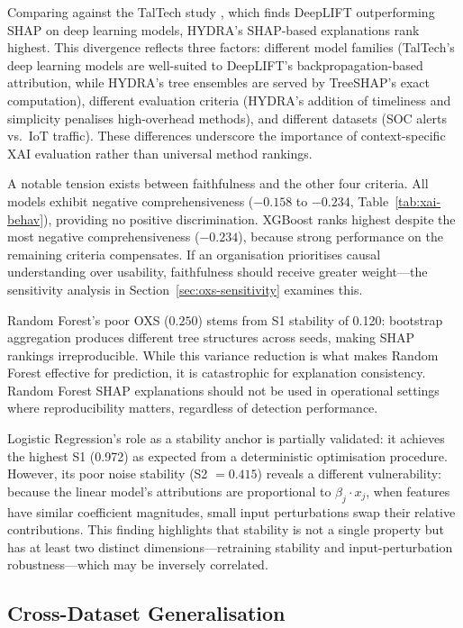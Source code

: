 \documentclass[12pt,a4paper]{report}
\begin{document}
Comparing against the TalTech study \cite{kalakoti2025}, which finds DeepLIFT outperforming SHAP on deep learning models, HYDRA's SHAP-based explanations rank highest. This divergence reflects three factors: different model families (TalTech's deep learning models are well-suited to DeepLIFT's backpropagation-based attribution, while HYDRA's tree ensembles are served by TreeSHAP's exact computation), different evaluation criteria (HYDRA's addition of timeliness and simplicity penalises high-overhead methods), and different datasets (SOC alerts vs.\ IoT traffic). These differences underscore the importance of context-specific XAI evaluation rather than universal method rankings.

A notable tension exists between faithfulness and the other four criteria. All models exhibit negative comprehensiveness ($-0.158$ to $-0.234$, Table~\ref{tab:xai-behav}), providing no positive discrimination. XGBoost ranks highest despite the most negative comprehensiveness ($-0.234$), because strong performance on the remaining criteria compensates. If an organisation prioritises causal understanding over usability, faithfulness should receive greater weight---the sensitivity analysis in Section~\ref{sec:oxs-sensitivity} examines this.

Random Forest's poor OXS ($0.250$) stems from S1 stability of 0.120: bootstrap aggregation \cite{breiman2001} produces different tree structures across seeds, making SHAP rankings irreproducible. While this variance reduction is what makes Random Forest effective for prediction, it is catastrophic for explanation consistency. Random Forest SHAP explanations should not be used in operational settings where reproducibility matters, regardless of detection performance.

Logistic Regression's role as a stability anchor is partially validated: it achieves the highest S1 (0.972) as expected from a deterministic optimisation procedure. However, its poor noise stability (S2 $= 0.415$) reveals a different vulnerability: because the linear model's attributions are proportional to $\beta_j \cdot x_j$, when features have similar coefficient magnitudes, small input perturbations swap their relative contributions. This finding highlights that stability is not a single property but has at least two distinct dimensions---retraining stability and input-perturbation robustness---which may be inversely correlated.

\subsection{Cross-Dataset Generalisation}
\label{sec:disc-cross}
\end{document}
